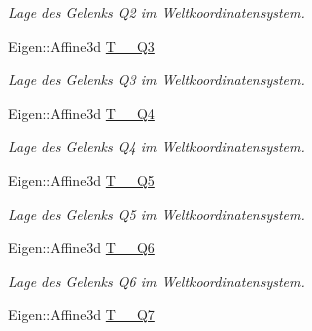 \begin{DoxyCompactItemize}
\begin{DoxyCompactList}\small\item\em Lage des Gelenks Q2 im Weltkoordinatensystem. \end{DoxyCompactList}\item 
\hypertarget{classNumericKinematic_a847dcb3a66622d8e67e9676e881e5030}{Eigen\-::\-Affine3d \hyperlink{classNumericKinematic_a847dcb3a66622d8e67e9676e881e5030}{T\-\_\-\_\-\-Q3}}\label{classNumericKinematic_a847dcb3a66622d8e67e9676e881e5030}

\begin{DoxyCompactList}\small\item\em Lage des Gelenks Q3 im Weltkoordinatensystem. \end{DoxyCompactList}\item 
\hypertarget{classNumericKinematic_a2dfc754d67f7c27cce1d05fd3d26fcbb}{Eigen\-::\-Affine3d \hyperlink{classNumericKinematic_a2dfc754d67f7c27cce1d05fd3d26fcbb}{T\-\_\-\_\-\-Q4}}\label{classNumericKinematic_a2dfc754d67f7c27cce1d05fd3d26fcbb}

\begin{DoxyCompactList}\small\item\em Lage des Gelenks Q4 im Weltkoordinatensystem. \end{DoxyCompactList}\item 
\hypertarget{classNumericKinematic_a72426b1ae1945e5a09daafb69e2d1deb}{Eigen\-::\-Affine3d \hyperlink{classNumericKinematic_a72426b1ae1945e5a09daafb69e2d1deb}{T\-\_\-\_\-\-Q5}}\label{classNumericKinematic_a72426b1ae1945e5a09daafb69e2d1deb}

\begin{DoxyCompactList}\small\item\em Lage des Gelenks Q5 im Weltkoordinatensystem. \end{DoxyCompactList}\item 
\hypertarget{classNumericKinematic_ad79c09069f78450e9a6c3657a390f4c2}{Eigen\-::\-Affine3d \hyperlink{classNumericKinematic_ad79c09069f78450e9a6c3657a390f4c2}{T\-\_\-\_\-\-Q6}}\label{classNumericKinematic_ad79c09069f78450e9a6c3657a390f4c2}

\begin{DoxyCompactList}\small\item\em Lage des Gelenks Q6 im Weltkoordinatensystem. \end{DoxyCompactList}\item 
\hypertarget{classNumericKinematic_a5a64e4e800ee0ae6da0b2df4b2fe35cf}{Eigen\-::\-Affine3d \hyperlink{classNumericKinematic_a5a64e4e800ee0ae6da0b2df4b2fe35cf}{T\-\_\-\_\-\-Q7}}\label{classNumericKinematic_a5a64e4e800ee0ae6da0b2df4b2fe35cf}


\end{DoxyCompactItemize}

